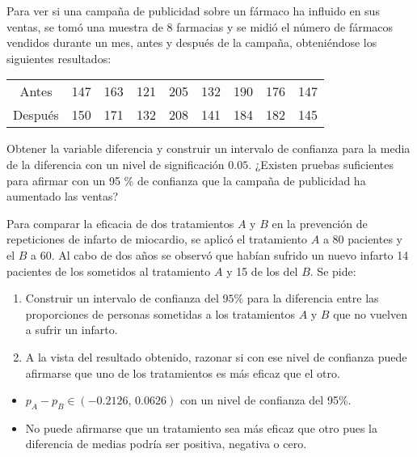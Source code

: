 {Para ver si una campaña de publicidad sobre un fármaco ha influido en sus ventas, se tomó una muestra de 8 farmacias
y se midió el número de fármacos vendidos durante un mes, antes y después de la campaña, obteniéndose los siguientes
resultados:
\begin{center}
\begin{tabular}{ccccccccc}
\toprule
Antes & 147 & 163 & 121 & 205 & 132 & 190 & 176 & 147  \\
Después & 150 & 171 & 132 & 208 & 141 & 184 & 182 & 145  \\
\bottomrule
\end{tabular}
\end{center}
Obtener la variable diferencia y construir un intervalo de confianza para la media de la diferencia con un nivel de
significación $0.05$.
¿Existen pruebas suficientes para afirmar con un 95 \% de confianza que la campaña de publicidad ha aumentado las
ventas?
}
{}
{}


{Para comparar la eficacia de dos tratamientos $A$ y $B$ en la prevención de repeticiones de infarto de miocardio, se
aplicó el tratamiento $A$ a 80 pacientes y el $B$ a 60.
Al cabo de dos años se observó que habían sufrido un nuevo infarto 14 pacientes de los sometidos al tratamiento $A$ y
15 de los del $B$.
Se pide:
\begin{enumerate}
\item Construir un intervalo de confianza del $95\%$ para la diferencia entre las proporciones de personas sometidas a los tratamientos $A$ y $B$ que no vuelven a sufrir un infarto.
\item A la vista del resultado obtenido, razonar si con ese nivel de confianza puede afirmarse que uno de los tratamientos es más eficaz que el otro.
\end{enumerate}
}
{
\begin{itemize}
\item $p_A-p_B\in (-0.2126,\,0.0626)$ con un nivel de confianza del 95\%.
\item No puede afirmarse que un tratamiento sea más eficaz que otro pues la diferencia de medias podría ser positiva,
negativa o cero. 
\end{itemize}
}
{}



